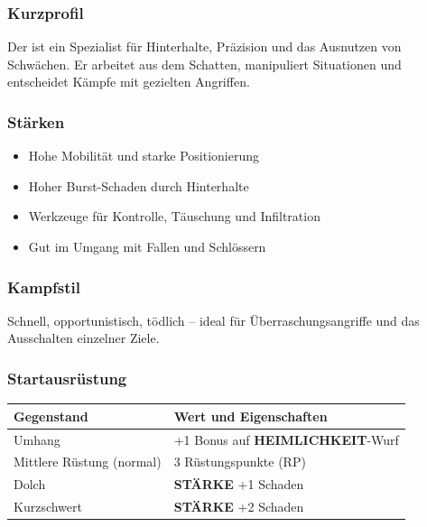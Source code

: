 \subsubsection*{Kurzprofil}
Der  ist ein Spezialist für Hinterhalte, Präzision und das Ausnutzen von Schwächen.
Er arbeitet aus dem Schatten, manipuliert Situationen und entscheidet Kämpfe mit gezielten Angriffen.

\subsubsection*{Stärken}
\begin{itemize}
	\item Hohe Mobilität und starke Positionierung
	\item Hoher Burst-Schaden durch Hinterhalte
	\item Werkzeuge für Kontrolle, Täuschung und Infiltration
	\item Gut im Umgang mit Fallen und Schlössern
\end{itemize}

\subsubsection*{Kampfstil}
Schnell, opportunistisch, tödlich – ideal für Überraschungsangriffe und das Ausschalten einzelner Ziele.

\subsubsection*{Startausrüstung}

\begin{center}
	\begin{tabular}{lp{9cm}}
		\toprule
		\textbf{Gegenstand} & \textbf{Wert und Eigenschaften} \\
		\midrule
		Umhang & +1 Bonus auf \textbf{HEIMLICHKEIT}-Wurf \\
		Mittlere Rüstung (normal) & 3 Rüstungspunkte (RP) \\
		Dolch & \textbf{STÄRKE} +1 Schaden \\
		Kurzschwert & \textbf{STÄRKE} +2 Schaden \\
		\bottomrule
	\end{tabular}
\end{center}

